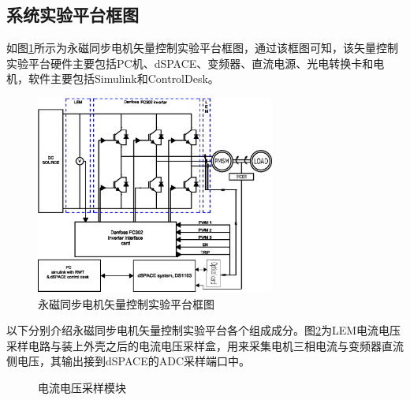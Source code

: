 \subsection{系统实验平台框图}
如图\ref{fig:system}所示为永磁同步电机矢量控制实验平台框图，通过该框图可知，该矢量控制实验平台硬件主要包括PC机、dSPACE、变频器、直流电源、光电转换卡和电机，软件主要包括Simulink和ControlDesk。
\begin{figure}[H]
	\centering
	\includegraphics[width=0.7\textwidth]{figs/system.eps}
	\caption{永磁同步电机矢量控制实验平台框图}
	\label{fig:system}
\end{figure}
以下分别介绍永磁同步电机矢量控制实验平台各个组成成分。图\ref{fig:LEMbox}为LEM电流电压采样电路与装上外壳之后的电流电压采样盒，用来采集电机三相电流与变频器直流侧电压，其输出接到dSPACE的ADC采样端口中。
\begin{figure} [h]
	\centering%
	\hspace{2em}%
	\caption{电流电压采样模块}
	\label{fig:LEMbox}
	\end{figure}
